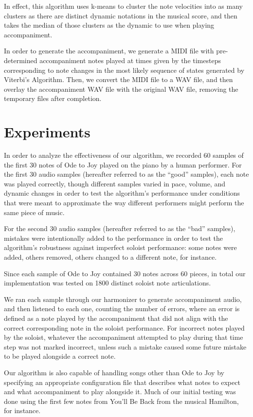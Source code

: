 \documentclass[11pt]{article}
\begin{document}
In effect, this algorithm uses k-means to cluster the note velocities into
as many clusters as there are distinct dynamic notations in the musical score,
and then takes the median of those clusters as the dynamic to use when
playing accompaniment.

In order to generate the accompaniment, we generate a MIDI file with
pre-determined accompaniment notes played at times given by the timesteps
corresponding to note changes in the most likely sequence of states generated
by Viterbi's Algorithm. Then, we convert the MIDI file to a WAV file,
and then overlay the accompaniment WAV file with the original WAV file,
removing the temporary files after completion.

\section{Experiments}

In order to analyze the effectiveness of our algorithm, we recorded 60
samples of the first 30 notes of Ode to Joy played on the piano by a human
performer. For the first 30 audio samples
(hereafter referred to as the ``good'' samples), each note was played correctly,
though different samples varied in pace, volume, and dynamic changes in order
to test the algorithm's performance under conditions that were meant to approximate
the way different performers might perform the same piece of music.

For the second 30 audio samples (hereafter referred to as the ``bad'' samples),
mistakes were intentionally added to the performance in order to test the algorithm's
robustness against imperfect soloist performance: some notes were added,
others removed, others changed to a different note, for instance.

Since each sample of Ode to Joy contained 30 notes across 60 pieces,
in total our implementation
was tested on 1800 distinct soloist note articulations.

We ran each sample through our harmonizer to generate accompaniment audio,
and then listened to each one, counting the number of errors, where an error is
defined as a note played by the accompaniment that did not align with the correct
corresponding note in the soloist performance. For incorrect notes played by
the soloist, whatever the accompaniment attempted to play during that time step
was not marked incorrect, unless such a mistake caused some future mistake to be
played alongside a correct note.

Our algorithm is also capable of handling songs other than Ode to Joy by specifying
an appropriate configuration file that describes what notes to expect and what
accompaniment to play alongside it. Much of our initial testing was done using
the first few notes from You'll Be Back from the musical Hamilton, for instance.
\end{document}
